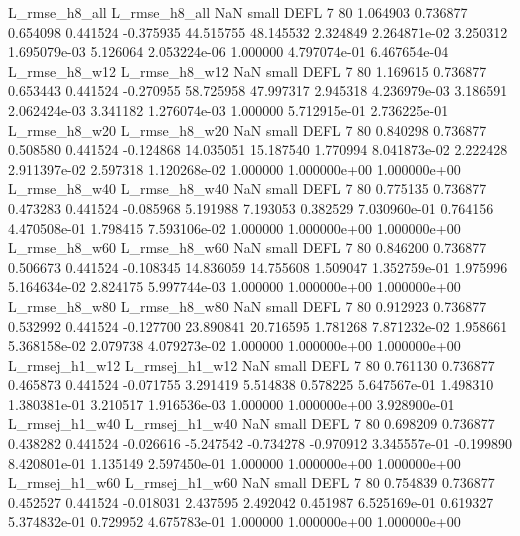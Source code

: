  L_rmse_h8_all  L_rmse_h8_all                   NaN      small     DEFL                 7 80 1.064903       0.736877 0.654098       0.441524   -0.375935     44.515755     48.145532     2.324849   2.264871e-02  3.250312 1.695079e-03     5.126064   2.053224e-06            1.000000    4.797074e-01        6.467654e-04
 L_rmse_h8_w12  L_rmse_h8_w12                   NaN      small     DEFL                 7 80 1.169615       0.736877 0.653443       0.441524   -0.270955     58.725958     47.997317     2.945318   4.236979e-03  3.186591 2.062424e-03     3.341182   1.276074e-03            1.000000    5.712915e-01        2.736225e-01
 L_rmse_h8_w20  L_rmse_h8_w20                   NaN      small     DEFL                 7 80 0.840298       0.736877 0.508580       0.441524   -0.124868     14.035051     15.187540     1.770994   8.041873e-02  2.222428 2.911397e-02     2.597318   1.120268e-02            1.000000    1.000000e+00        1.000000e+00
 L_rmse_h8_w40  L_rmse_h8_w40                   NaN      small     DEFL                 7 80 0.775135       0.736877 0.473283       0.441524   -0.085968      5.191988      7.193053     0.382529   7.030960e-01  0.764156 4.470508e-01     1.798415   7.593106e-02            1.000000    1.000000e+00        1.000000e+00
 L_rmse_h8_w60  L_rmse_h8_w60                   NaN      small     DEFL                 7 80 0.846200       0.736877 0.506673       0.441524   -0.108345     14.836059     14.755608     1.509047   1.352759e-01  1.975996 5.164634e-02     2.824175   5.997744e-03            1.000000    1.000000e+00        1.000000e+00
 L_rmse_h8_w80  L_rmse_h8_w80                   NaN      small     DEFL                 7 80 0.912923       0.736877 0.532992       0.441524   -0.127700     23.890841     20.716595     1.781268   7.871232e-02  1.958661 5.368158e-02     2.079738   4.079273e-02            1.000000    1.000000e+00        1.000000e+00
L_rmsej_h1_w12 L_rmsej_h1_w12                   NaN      small     DEFL                 7 80 0.761130       0.736877 0.465873       0.441524   -0.071755      3.291419      5.514838     0.578225   5.647567e-01  1.498310 1.380381e-01     3.210517   1.916536e-03            1.000000    1.000000e+00        3.928900e-01
L_rmsej_h1_w40 L_rmsej_h1_w40                   NaN      small     DEFL                 7 80 0.698209       0.736877 0.438282       0.441524   -0.026616     -5.247542     -0.734278    -0.970912   3.345557e-01 -0.199890 8.420801e-01     1.135149   2.597450e-01            1.000000    1.000000e+00        1.000000e+00
L_rmsej_h1_w60 L_rmsej_h1_w60                   NaN      small     DEFL                 7 80 0.754839       0.736877 0.452527       0.441524   -0.018031      2.437595      2.492042     0.451987   6.525169e-01  0.619327 5.374832e-01     0.729952   4.675783e-01            1.000000    1.000000e+00        1.000000e+00
